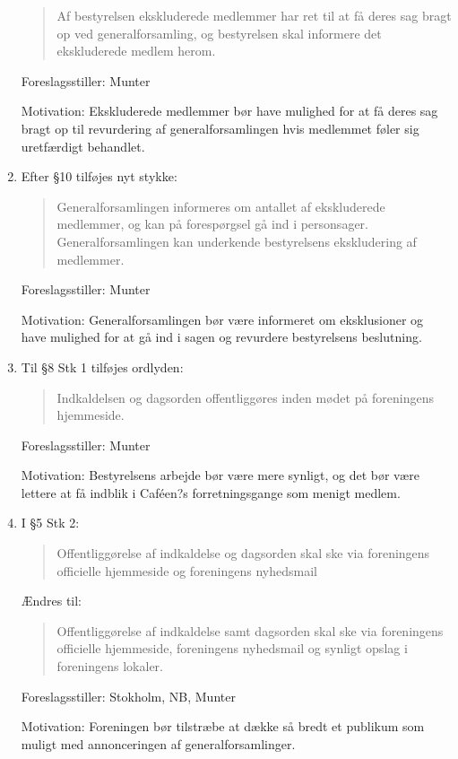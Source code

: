 \documentclass[a4paper,12pt,danish]{article}
\begin{document}
\begin{enumerate}
    \begin{quote}
Af bestyrelsen ekskluderede medlemmer har ret til at få deres sag
bragt op ved generalforsamling, og bestyrelsen skal informere det
ekskluderede medlem herom.
\end{quote}

    Foreslagsstiller: Munter

    Motivation: Ekskluderede medlemmer bør have mulighed for at få deres sag bragt op til revurdering af generalforsamlingen hvis medlemmet føler sig uretfærdigt behandlet.

\item Efter \S10 tilføjes nyt stykke:
\begin{quote}
Generalforsamlingen informeres om antallet af ekskluderede medlemmer, og kan på forespørgsel gå ind i personsager. Generalforsamlingen kan underkende bestyrelsens ekskludering af medlemmer.
\end{quote}

Foreslagsstiller: Munter

Motivation: Generalforsamlingen bør være informeret om eksklusioner og have mulighed for at gå ind i sagen og revurdere bestyrelsens beslutning.

\item Til \S8 Stk 1 tilføjes ordlyden:
\begin{quote}
Indkaldelsen og dagsorden offentliggøres inden mødet på foreningens hjemmeside.
\end{quote}

Foreslagsstiller: Munter

Motivation: Bestyrelsens arbejde bør være mere synligt, og det bør være lettere at få indblik i Caféen?s forretningsgange som menigt medlem.

\item I \S5 Stk 2:
\begin{quote}
Offentliggørelse af indkaldelse og dagsorden skal ske via foreningens officielle hjemmeside og foreningens nyhedsmail
\end{quote}

Ændres til:

\begin{quote}
Offentliggørelse af indkaldelse samt dagsorden skal ske via foreningens officielle hjemmeside, foreningens nyhedsmail og synligt opslag i foreningens lokaler.
\end{quote}

Foreslagsstiller: Stokholm, NB, Munter

Motivation: Foreningen bør tilstræbe at dække så bredt et publikum som muligt med annonceringen af generalforsamlinger.


\end{enumerate}
\end{document}
